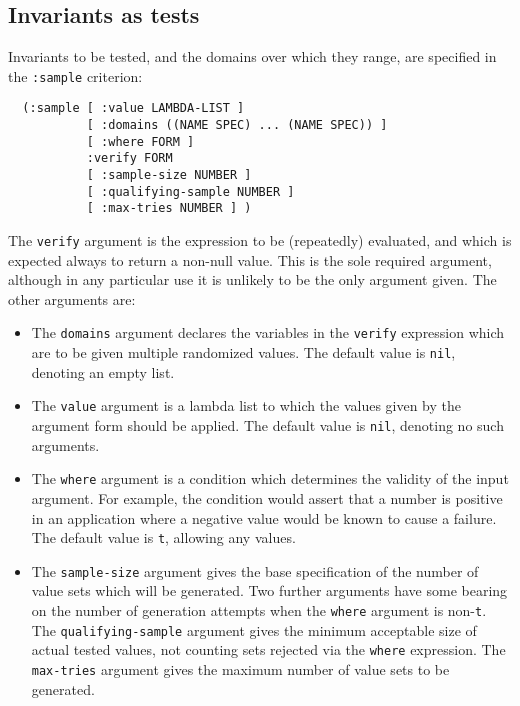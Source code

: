 \subsection{Invariants as tests}
\label{sec:quickcheck-tests}
Invariants to be tested, and the domains over which they range, are
specified in the \texttt{:sample} criterion:
\begin{verbatim}
  (:sample [ :value LAMBDA-LIST ]
           [ :domains ((NAME SPEC) ... (NAME SPEC)) ]
           [ :where FORM ]
           :verify FORM
           [ :sample-size NUMBER ]
           [ :qualifying-sample NUMBER ]
           [ :max-tries NUMBER ] )
\end{verbatim}
The \texttt{verify} argument is the expression to be (repeatedly)
evaluated, and which is expected always to return a non-null value.
This is the sole required argument, although in any particular use it
is unlikely to be the only argument given.  The other arguments are:
\begin{itemize}
\item The \texttt{domains} argument declares the
  variables in the \texttt{verify} expression which are to be given
  multiple randomized values.  The default value is \texttt{nil},
  denoting an empty list.
\item The \texttt{value} argument is a lambda list
  to which the values given by the argument form should be applied.
  The default value is \texttt{nil}, denoting no such arguments.
\item The \texttt{where} argument is a condition
  which determines the validity of the input argument.  For example,
  the condition would assert that a number is positive in an
  application where a negative value would be known to cause a
  failure.  The default value is \texttt{t}, allowing any values.
\item The \texttt{sample-size} argument
  gives the base specification of the number of value sets which will
  be generated.  Two further arguments have some bearing on the number
  of generation attempts when the \texttt{where} argument is
  non-\texttt{t}.  The
  \texttt{qualifying-sample} argument
  gives the minimum acceptable size of actual tested values, not
  counting sets rejected via the \texttt{where} expression.  The
  \texttt{max-tries} argument gives the
  maximum number of value sets to be generated.
\end{itemize}

